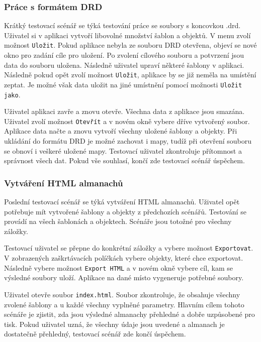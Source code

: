 \documentclass[thesis=B,czech]{resources/FITthesis}[2012/06/26]
\begin{document}
\subsubsection{Práce s formátem DRD}
Krátký testovací scénář se týká testování práce se soubory s koncovkou .drd. Uživatel si v aplikaci vytvoří libovolné množství šablon a objektů. V menu zvolí možnost \texttt{Uložit}. Pokud aplikace nebyla ze souboru DRD otevřena, objeví se nové okno pro zadání cíle pro uložení. Po zvolení cílového souboru a potvrzení jsou data do souboru uložena. Následně uživatel upraví některé šablony v aplikaci. Následně pokud opět zvolí možnost \texttt{Uložit}, aplikace by se již neměla na umístění zeptat. Je možné však data uložit na jiné umístnění pomocí možnosti \texttt{Uložit jako}. \par

Uživatel aplikaci zavře a znovu otevře. Všechna data z aplikace jsou smazána. Uživatel zvolí možnost \texttt{Otevřít} a v novém okně vybere dříve vytvořený soubor. Aplikace data načte a znovu vytvoří všechny uložené šablony a objekty. Při ukládání do formátu DRD je možné zachovat i mapy, tudíž při otevření souboru se obnoví i veškeré uložené mapy. Testovací uživatel zkontroluje přítomnost a správnost všech dat. Pokud vše souhlasí, končí zde testovací scénář úspěchem.

\subsubsection{Vytváření HTML almanachů}
Poslední testovací scénář se týká vytváření HTML almanachů. Uživatel opět potřebuje mít vytvořené šablony a objekty z předchozích scénářů. Testování se provádí na všech šablonách a objektech. Scénáře jsou totožné pro všechny záložky. \par

Testovací uživatel se přepne do konkrétní záložky a vybere možnost \texttt{Exportovat}. V zobrazených zaškrtávacích políčkách vybere objekty, které chce exportovat. Následně vybere možnost \texttt{Export HTML} a v novém okně vybere cíl, kam se výsledné soubory uloží. Aplikace na dané místo vygeneruje potřebné soubory. \par

Uživatel otevře soubor \texttt{index.html}. Soubor zkontroluje, že obsahuje všechny zvolené šablony a u každé všechny vyplněné parametry. Hlavním cílem tohoto scénáře je zjistit, zda jsou výsledné almanachy přehledné a dobře uzpůsobené pro tisk. Pokud uživatel uzná, že všechny údaje jsou uvedené a almanach je dostatečně přehledný, testovací scénář zde končí úspěchem. 
\end{document}
